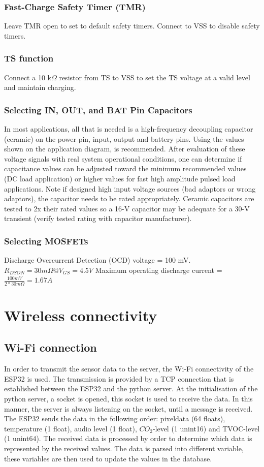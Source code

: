 \documentclass[11pt,a4paper]{article}
\begin{document}
\subsubsection{Fast-Charge Safety Timer (TMR)}
Leave TMR open to set to default safety timers. Connect to VSS to disable safety timers.

\subsubsection{TS function}
Connect a 10 k$\Omega$ resistor from TS to VSS to set the TS voltage at a valid level and maintain charging.

\subsubsection{Selecting IN, OUT, and BAT Pin Capacitors}
In most applications, all that is needed is a high-frequency decoupling capacitor (ceramic) on the power pin, input, output and battery pins. Using the values shown on the application diagram, is recommended. After evaluation of these voltage signals with real system operational conditions, one can determine if capacitance values can be adjusted toward the minimum recommended values (DC load application) or higher values for fast high amplitude pulsed load applications. Note if designed high input voltage sources (bad adaptors or wrong adaptors), the capacitor needs to be rated appropriately. Ceramic capacitors are tested to 2x their rated values so a 16-V capacitor may be adequate for a 30-V transient (verify tested rating with capacitor manufacturer).

\subsubsection{Selecting MOSFETs}
Discharge Overcurrent Detection (OCD) voltage = 100 mV. $R_{DSON} = 30 m\Omega @ V_{GS} = 4.5 V$
Maximum operating discharge current = $\frac{100 mV}{2*30 m\Omega} = 1.67 A$

\section{Wireless connectivity}
\subsection{Wi-Fi connection}
In order to transmit the sensor data to the server, the Wi-Fi connectivity of the ESP32 is used. The transmission is provided by a TCP connection that is established between the ESP32 and the python server. At the initialisation of the python server, a socket is opened, this socket is used to receive the data. In this manner, the server is always listening on the socket, until a message is received. The ESP32 sends the data in the following order: pixeldata (64 floats), temperature (1 float), audio level (1 float), $CO_2$-level (1 unint16) and TVOC-level (1 unint64). The received data is processed by order to determine which data is represented by the received values. The data is parsed into different variable, these variables are then used to update the values in the database. 
\end{document}
